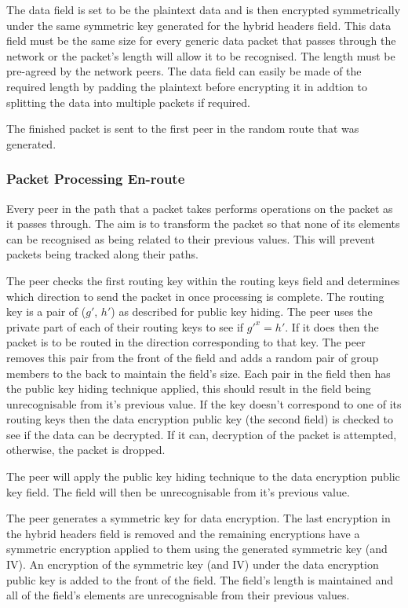 \documentclass[ %
                    author={Luke Murray},
                supervisor={Dr. Simon Hollis},
                     title={Shadow Peer-to-Peer Networks},
                  subtitle={},
                    degree={MEng},
                      year={2013} ]{thesis}
\begin{document}
The data field is set to be the plaintext data and is then encrypted symmetrically under the same symmetric key generated for the hybrid headers field. This data field must be the same size for every generic data packet that passes through the network or the packet's length will allow it to be recognised. The length must be pre-agreed by the network peers. The data field can easily be made of the required length by padding the plaintext before encrypting it in addtion to splitting the data into multiple packets if required.

The finished packet is sent to the first peer in the random route that was generated.

\subsubsection{Packet Processing En-route}

Every peer in the path that a packet takes performs operations on the packet as it passes through. The aim is to transform the packet so that none of its elements can be recognised as being related to their previous values. This will prevent packets being tracked along their paths.

The peer checks the first routing key within the routing keys field and determines which direction to send the packet in once processing is complete. The routing key is a pair of ($g\prime$, $h\prime$) as described for public key hiding. The peer uses the private part of each of their routing keys to see if $g\prime^{x} = h\prime$. If it does then the packet is to be routed in the direction corresponding to that key. The peer removes this pair from the front of the field and adds a random pair of group members to the back to maintain the field's size. Each pair in the field then has the public key hiding technique applied, this should result in the field being unrecognisable from it's previous value. If the key doesn't correspond to one of its routing keys then the data encryption public key (the second field) is checked to see if the data can be decrypted. If it can, decryption of the packet is attempted, otherwise, the packet is dropped.

The peer will apply the public key hiding technique to the data encryption public key field. The field will then be unrecognisable from it's previous value.

The peer generates a symmetric key for data encryption. The last encryption in the hybrid headers field is removed and the remaining encryptions have a symmetric encryption applied to them using the generated symmetric key (and IV). An encryption of the symmetric key (and IV) under the data encryption public key is added to the front of the field. The field's length is maintained and all of the field's elements are unrecognisable from their previous values.
\end{document}
